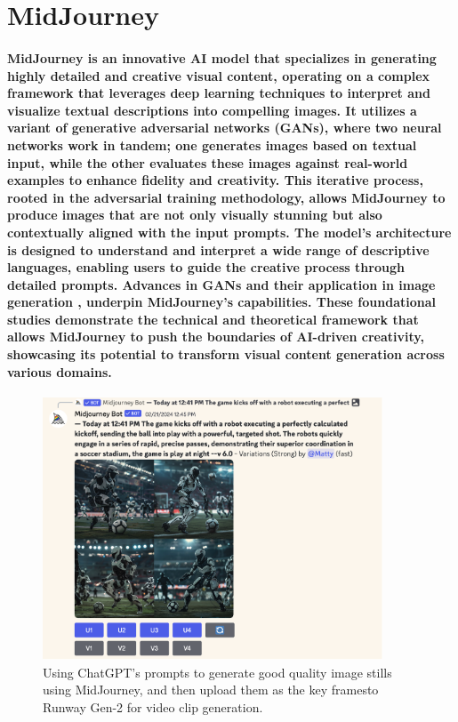 \documentclass[11pt,a4paper,oneside]{report}
\begin{document}
\section{MidJourney}
\paragraph{MidJourney is an innovative AI model that specializes in generating highly detailed and creative visual content, operating on a complex framework that leverages deep learning techniques to interpret and visualize textual descriptions into compelling images. It utilizes a variant of generative adversarial networks (GANs), where two neural networks work in tandem; one generates images based on textual input, while the other evaluates these images against real-world examples to enhance fidelity and creativity. This iterative process, rooted in the adversarial training methodology, allows MidJourney to produce images that are not only visually stunning but also contextually aligned with the input prompts. The model's architecture is designed to understand and interpret a wide range of descriptive languages, enabling users to guide the creative process through detailed prompts. Advances in GANs and their application in image generation \cite{goodfellow2014generative} \cite{karras2019style}, underpin MidJourney's capabilities. These foundational studies demonstrate the technical and theoretical framework that allows MidJourney to push the boundaries of AI-driven creativity, showcasing its potential to transform visual content generation across various domains.}

\begin{figure}[htbp]
  \centering
  \includegraphics[width=0.9\textwidth]{mj.png}
  \caption{Using ChatGPT's prompts to generate good quality image stills using MidJourney, and then upload them as the key framesto Runway Gen-2 for video clip generation.}
\end{figure}
\end{document}
